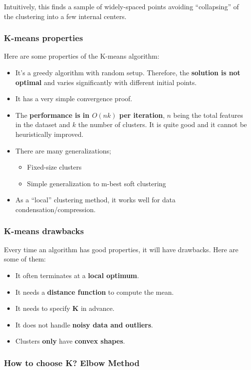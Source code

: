 Intuitively, this finds a sample of widely-spaced points avoiding ``collapsing'' of the clustering into a few internal centers.

\subsubsection{K-means properties}

Here are some properties of the K-means algorithm:
\begin{itemize}
 \item It's a greedy algorithm with random setup. Therefore, the {\bf solution is not optimal} and varies significantly with different initial points.
 \item It has a very simple convergence proof.
 \item The {\bf performance is in $O(nk)$ per iteration}, $n$ being the total features in the dataset and $k$ the number of clusters. It is quite good and it cannot be heuristically improved.
 \item There are many generalizations;
 \begin{itemize}
  \item Fixed-size clusters
  \item Simple generalization to m-best soft clustering
 \end{itemize}
 \item As a ``local'' clustering method, it works well for data condensation/compression.
\end{itemize}

\subsubsection{K-means drawbacks}

Every time an algorithm has good properties, it will have drawbacks. Here are some of them:
\begin{itemize}
 \item It often terminates at a {\bf local optimum}.
 \item It needs a {\bf distance function} to compute the mean.
 \item It needs to specify {\bf K} in advance.
 \item It does not handle {\bf noisy data and outliers}.
 \item Clusters {\bf only} have {\bf convex shapes}.
\end{itemize}

\subsubsection{How to choose K? Elbow Method}

